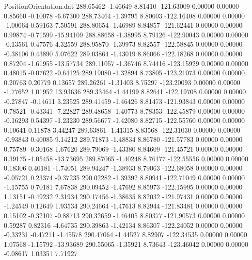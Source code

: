 \begin{filecontents}{PositionOrientation.dat}
 288.65462   -1.46649    8.81410  -121.63009    0.00000    0.00000    0.85660   -0.10078   -6.67300
 288.73464   -1.39795    8.80603  -122.16408    0.00000    0.00000   -1.00064    0.59163    7.50591
 288.80654   -1.46989    8.84857  -121.62441    0.00000    0.00000    0.99874   -0.71599  -15.94109
 288.88658   -1.38995    8.79126  -122.90043    0.00000    0.00000   -0.13561    0.47576    4.32559
 288.95870   -1.39973    8.82557  -122.58845    0.00000    0.00000   -0.38106    0.43890    5.07622
 289.03864   -1.43019    8.86066  -122.18268    0.00000    0.00000    0.87204   -1.61955  -13.57734
 289.11057   -1.36746    8.74416  -123.15929    0.00000    0.00000    0.48015   -0.07622   -0.64125
 289.19080   -1.32894    8.73805  -123.21073    0.00000    0.00000    0.20763    0.20779    0.13657
 289.26261   -1.31403    8.75297  -123.20093    0.00000    0.00000   -1.77652    1.01952   13.93636
 289.33464   -1.44199    8.82641  -122.19708    0.00000    0.00000   -0.27847   -0.14611    3.23525
 289.41459   -1.46426    8.81473  -121.93843    0.00000    0.00000    0.78521   -0.43341   -7.22827
 289.48658   -1.40773    8.78353  -122.45879    0.00000    0.00000   -0.16293    0.54397   -1.23230
 289.56677   -1.42080    8.82715  -122.55760    0.00000    0.00000    0.10641    0.11878    3.44247
 289.63861   -1.41315    8.83568  -122.31030    0.00000    0.00000   -0.93843    0.40085    9.14212
 289.71873   -1.48834    8.86780  -121.57783    0.00000    0.00000    0.75789   -0.30168    1.67620
 289.79069   -1.43380    8.84609  -121.45721    0.00000    0.00000    0.39175   -1.05458  -13.73695
 289.87065   -1.40248    8.76177  -122.55556    0.00000    0.00000    0.18306    0.40181   -1.74051
 289.94247   -1.38933    8.79063  -122.68058    0.00000    0.00000   -0.05721    0.23374   -0.37235
 290.02282   -1.39392    8.80941  -122.71049    0.00000    0.00000   -1.15755    0.70181    7.67838
 290.09452   -1.47692    8.85973  -122.15995    0.00000    0.00000    1.13151   -0.49232    2.31934
 290.17456   -1.38635    8.82032  -121.97431    0.00000    0.00000   -1.24549    0.12649    1.93534
 290.24664   -1.47613    8.82944  -121.83481    0.00000    0.00000    0.15102   -0.32107   -0.88713
 290.32659   -1.46405    8.80377  -121.90573    0.00000    0.00000    0.59287    0.82316   -4.64735
 290.39863   -1.42134    8.86307  -122.24052    0.00000    0.00000   -0.33231   -0.47211   -1.45578
 290.47064   -1.44527    8.82907  -122.34535    0.00000    0.00000    1.07568   -1.15792  -13.93689
 290.55065   -1.35921    8.73643  -123.46042    0.00000    0.00000   -0.08617    1.03351    7.71927

\end{filecontents}
